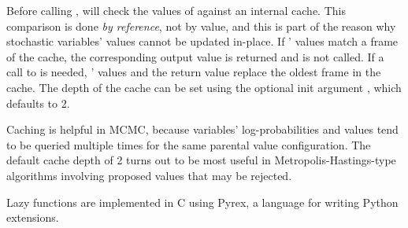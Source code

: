 Before calling ,  will check the values of  against an internal cache. This comparison is done \emph{by reference}, not by value, and this is part of the reason why stochastic variables' values cannot be updated in-place. If ' values match a frame of the cache, the corresponding output value is returned and  is not called. If a call to  is needed, ' values and the return value replace the oldest frame in the cache. The depth of the cache can be set using the optional init argument , which defaults to 2.

Caching is helpful in MCMC, because variables' log-probabilities and values tend to be queried multiple times for the same parental value configuration. The default cache depth of 2 turns out to be most useful in Metropolis-Hastings-type algorithms involving proposed values that may be rejected.

Lazy functions are implemented in C using Pyrex, a language for writing Python extensions.